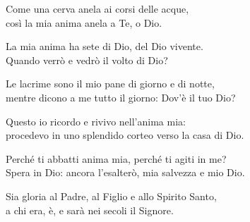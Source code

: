 

\spazio

\strofa Come una cerva anela ai corsi delle acque,\\
così la mia anima anela a Te, o Dio.

\spazio


\spazio

\strofa La mia anima ha sete di Dio, del Dio vivente.\\
Quando verrò e vedrò il volto di Dio?

\spazio


\spazio

\strofa Le lacrime sono il mio pane di giorno e di notte,\\
mentre dicono a me tutto il giorno: Dov'è il tuo Dio?

\spazio


\spazio

\strofa Questo io ricordo e rivivo nell'anima mia:\\
procedevo in uno splendido corteo verso la casa di Dio.

\spazio


\spazio

\strofa Perché ti abbatti anima mia, perché ti agiti in me?\\
Spera in Dio: ancora l'esalterò, mia salvezza e mio Dio.

\spazio


\spazio

\strofa Sia gloria al Padre, al Figlio e allo Spirito Santo,\\
a chi era, è, e sarà nei secoli il Signore.

\spazio

